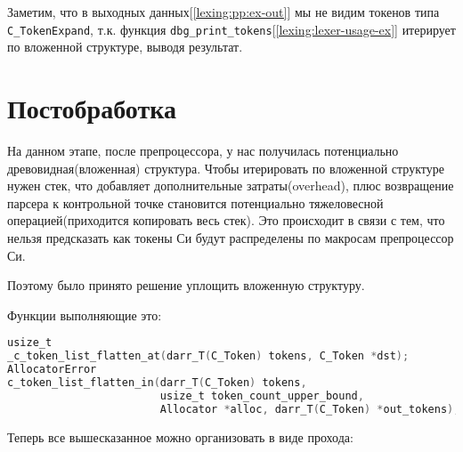 Заметим, что в выходных данных[\ref{lexing:pp:ex-out}] мы не видим токенов типа \verb|C_TokenExpand|, 
т.к. функция \verb|dbg_print_tokens|[\ref{lexing:lexer-usage-ex}] итерирует по вложенной структуре, выводя  результат.

\section{Постобработка}

На данном этапе, после препроцессора, у нас получилась потенциально древовидная(вложенная) структура.
Чтобы итерировать по вложенной структуре нужен стек, что добавляет дополнительные затраты(overhead), 
плюс возвращение парсера к контрольной точке становится потенциально тяжеловесной операцией(приходится копировать весь стек).
Это происходит в связи с тем, что нельзя предсказать как токены Си будут распределены по макросам препроцессор Си.






Поэтому было принято решение уплощить вложенную структуру.

Функции выполняющие это:
\begin{lstlisting}[language=c, caption={Заголовки функций уплощения}, label={lexing:flat-fns}]
usize_t
_c_token_list_flatten_at(darr_T(C_Token) tokens, C_Token *dst);
AllocatorError
c_token_list_flatten_in(darr_T(C_Token) tokens, 
                        usize_t token_count_upper_bound, 
                        Allocator *alloc, darr_T(C_Token) *out_tokens); 
\end{lstlisting}


Теперь все вышесказанное можно организовать в виде прохода:

